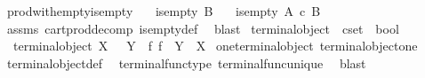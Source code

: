 \begin{isabellebody}
\ prod{\isacharunderscore}{\kern0pt}with{\isacharunderscore}{\kern0pt}empty{\isacharunderscore}{\kern0pt}is{\isacharunderscore}{\kern0pt}empty{}{\isacharcolon}{\kern0pt}\isanewline
\ \ \ {\isachardoublequoteopen}is{\isacharunderscore}{\kern0pt}empty\ {\isacharparenleft}{\kern0pt}B{\isacharparenright}{\kern0pt}{\isachardoublequoteclose}\isanewline
\ \ \ {\isachardoublequoteopen}is{\isacharunderscore}{\kern0pt}empty\ {\isacharparenleft}{\kern0pt}A\ {\isasymtimes}\isactrlsub c\ B{\isacharparenright}{\kern0pt}{\isachardoublequoteclose}\isanewline
%
\isadelimproof
\ \ %
\endisadelimproof
%
\isatagproof
{}\isamarkupfalse%
\ assms\ cart{\isacharunderscore}{\kern0pt}prod{\isacharunderscore}{\kern0pt}decomp\ is{\isacharunderscore}{\kern0pt}empty{\isacharunderscore}{\kern0pt}def\ \isamarkupfalse%
\ blast%
\endisatagproof
{\isafoldproof}%
%
\isadelimproof
%
\endisadelimproof
%
\isadelimdocument
%
\endisadelimdocument
%
\isatagdocument
%
\isamarkuptrue%
%
\endisatagdocument
{\isafolddocument}%
%
\isadelimdocument
%
\endisadelimdocument
{}\isamarkupfalse%
\ terminal{\isacharunderscore}{\kern0pt}object\ {\isacharcolon}{\kern0pt}{\isacharcolon}{\kern0pt}\ {\isachardoublequoteopen}cset\ {\isasymRightarrow}\ bool{\isachardoublequoteclose}\ \isanewline
\ \ {\isachardoublequoteopen}terminal{\isacharunderscore}{\kern0pt}object\ X\ {\isasymlongleftrightarrow}\ {\isacharparenleft}{\kern0pt}{\isasymforall}\ Y{\isachardot}{\kern0pt}\ {\isasymexists}{\isacharbang}{\kern0pt}\ f{\isachardot}{\kern0pt}\ f\ {\isacharcolon}{\kern0pt}\ Y\ {\isasymrightarrow}\ X{\isacharparenright}{\kern0pt}{\isachardoublequoteclose}\isanewline
\isanewline
{}\isamarkupfalse%
\ one{\isacharunderscore}{\kern0pt}terminal{\isacharunderscore}{\kern0pt}object{\isacharcolon}{\kern0pt}\ {\isachardoublequoteopen}terminal{\isacharunderscore}{\kern0pt}object{\isacharparenleft}{\kern0pt}one{\isacharparenright}{\kern0pt}{\isachardoublequoteclose}\isanewline
%
\isadelimproof
\ \ %
\endisadelimproof
%
\isatagproof
{}\isamarkupfalse%
\ terminal{\isacharunderscore}{\kern0pt}object{\isacharunderscore}{\kern0pt}def\ \isamarkupfalse%
\ terminal{\isacharunderscore}{\kern0pt}func{\isacharunderscore}{\kern0pt}type\ terminal{\isacharunderscore}{\kern0pt}func{\isacharunderscore}{\kern0pt}unique\ \isamarkupfalse%
\ blast%
\endisatagproof
{\isafoldproof}%
%
\isadelimproof
%
\endisadelimproof

\end{isabellebody}
